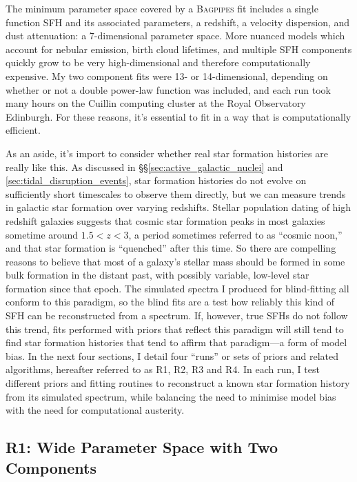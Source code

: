 \documentclass[a4paper,11pt]{article}
\begin{document}
The minimum parameter space covered by a \textsc{Bagpipes} fit includes a single function SFH and its associated parameters, a redshift, a velocity dispersion, and dust attenuation: a 7-dimensional parameter space. More nuanced models which account for nebular emission, birth cloud lifetimes, and multiple SFH components quickly grow to be very high-dimensional and therefore computationally expensive. My two component fits were 13- or 14-dimensional, depending on whether or not a double power-law function was included, and each run took many hours on the Cuillin computing cluster at the Royal Observatory Edinburgh. For these reasons, it's essential to fit in a way that is computationally efficient.

As an aside, it's import to consider whether real star formation histories are really like this. As discussed in \S\S\ref{sec:active_galactic_nuclei} and \ref{sec:tidal_disruption_events}, star formation histories do not evolve on sufficiently short timescales to observe them directly, but we can measure trends in galactic star formation over varying redshifts. Stellar population dating of high redshift galaxies suggests that cosmic star formation peaks in most galaxies sometime around $1.5 < z < 3$, a period sometimes referred to as ``cosmic noon,'' and that star formation is ``quenched'' after this time.\cite{Feldmann_2016} So there are compelling reasons to believe that most of a galaxy's stellar mass should be formed in some bulk formation in the distant past, with possibly variable, low-level star formation since that epoch. The simulated spectra I produced for blind-fitting all conform to this paradigm, so the blind fits are a test how reliably this kind of SFH can be reconstructed from a spectrum. If, however, true SFHs do not follow this trend, fits performed with priors that reflect this paradigm will still tend to find star formation histories that tend to affirm that paradigm---a form of model bias. In the next four sections, I detail four ``runs'' or sets of priors and related algorithms, hereafter referred to as R1, R2, R3 and R4. In each run, I test different priors and fitting routines to reconstruct a known star formation history from its simulated spectrum, while balancing the need to minimise model bias with the need for computational austerity.

\subsection{R1: Wide Parameter Space with Two Components}\label{sec:r1}
\end{document}
